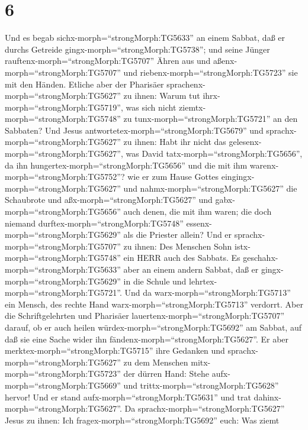 \hypertarget{section-5}{%
\section{6}\label{section-5}}

 Und es begab sichx-morph=``strongMorph:TG5633'' an einem
Sabbat, daß er durchs Getreide gingx-morph=``strongMorph:TG5738''; und
seine Jünger rauftenx-morph=``strongMorph:TG5707'' Ähren aus und
aßenx-morph=``strongMorph:TG5707'' und
riebenx-morph=``strongMorph:TG5723'' sie mit den Händen. 
Etliche aber der Pharisäer sprachenx-morph=``strongMorph:TG5627'' zu
ihnen: Warum tut ihrx-morph=``strongMorph:TG5719'', was sich nicht
ziemtx-morph=``strongMorph:TG5748'' zu tunx-morph=``strongMorph:TG5721''
an den Sabbaten?  Und Jesus
antwortetex-morph=``strongMorph:TG5679'' und
sprachx-morph=``strongMorph:TG5627'' zu ihnen: Habt ihr nicht das
gelesenx-morph=``strongMorph:TG5627'', was David
tatx-morph=``strongMorph:TG5656'', da ihn
hungertex-morph=``strongMorph:TG5656'' und die mit ihm
warenx-morph=``strongMorph:TG5752''?  wie er zum Hause
Gottes eingingx-morph=``strongMorph:TG5627'' und
nahmx-morph=``strongMorph:TG5627'' die Schaubrote und
aßx-morph=``strongMorph:TG5627'' und gabx-morph=``strongMorph:TG5656''
auch denen, die mit ihm waren; die doch niemand
durftex-morph=``strongMorph:TG5748'' essenx-morph=``strongMorph:TG5629''
als die Priester allein?  Und er
sprachx-morph=``strongMorph:TG5707'' zu ihnen: Des Menschen Sohn
istx-morph=``strongMorph:TG5748'' ein HERR auch des Sabbats.
 Es geschahx-morph=``strongMorph:TG5633'' aber an einem
andern Sabbat, daß er gingx-morph=``strongMorph:TG5629'' in die Schule
und lehrtex-morph=``strongMorph:TG5721''. Und da
warx-morph=``strongMorph:TG5713'' ein Mensch, des rechte Hand
warx-morph=``strongMorph:TG5713'' verdorrt.  Aber die
Schriftgelehrten und Pharisäer lauertenx-morph=``strongMorph:TG5707''
darauf, ob er auch heilen würdex-morph=``strongMorph:TG5692'' am Sabbat,
auf daß sie eine Sache wider ihn fändenx-morph=``strongMorph:TG5627''.
 Er aber merktex-morph=``strongMorph:TG5715'' ihre Gedanken
und sprachx-morph=``strongMorph:TG5627'' zu dem Menschen
mitx-morph=``strongMorph:TG5723'' der dürren Hand: Stehe
aufx-morph=``strongMorph:TG5669'' und
trittx-morph=``strongMorph:TG5628'' hervor! Und er stand
aufx-morph=``strongMorph:TG5631'' und trat
dahinx-morph=``strongMorph:TG5627''.  Da
sprachx-morph=``strongMorph:TG5627'' Jesus zu ihnen: Ich
fragex-morph=``strongMorph:TG5692'' euch: Was ziemt
